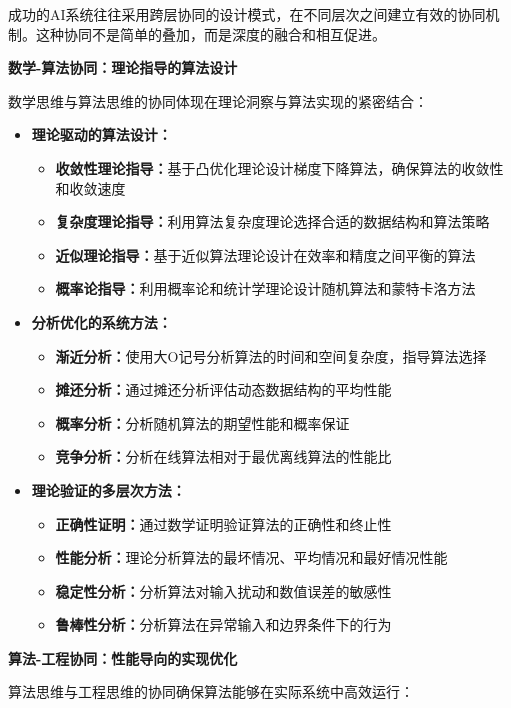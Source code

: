 成功的AI系统往往采用跨层协同的设计模式，在不同层次之间建立有效的协同机制。这种协同不是简单的叠加，而是深度的融合和相互促进。

\textbf{数学-算法协同：理论指导的算法设计}

数学思维与算法思维的协同体现在理论洞察与算法实现的紧密结合：

\begin{itemize}
\item \textbf{理论驱动的算法设计：}
\begin{itemize}
\item \textbf{收敛性理论指导：}基于凸优化理论设计梯度下降算法，确保算法的收敛性和收敛速度
\item \textbf{复杂度理论指导：}利用算法复杂度理论选择合适的数据结构和算法策略
\item \textbf{近似理论指导：}基于近似算法理论设计在效率和精度之间平衡的算法
\item \textbf{概率论指导：}利用概率论和统计学理论设计随机算法和蒙特卡洛方法
\end{itemize}

\item \textbf{分析优化的系统方法：}
\begin{itemize}
\item \textbf{渐近分析：}使用大O记号分析算法的时间和空间复杂度，指导算法选择
\item \textbf{摊还分析：}通过摊还分析评估动态数据结构的平均性能
\item \textbf{概率分析：}分析随机算法的期望性能和概率保证
\item \textbf{竞争分析：}分析在线算法相对于最优离线算法的性能比
\end{itemize}

\item \textbf{理论验证的多层次方法：}
\begin{itemize}
\item \textbf{正确性证明：}通过数学证明验证算法的正确性和终止性
\item \textbf{性能分析：}理论分析算法的最坏情况、平均情况和最好情况性能
\item \textbf{稳定性分析：}分析算法对输入扰动和数值误差的敏感性
\item \textbf{鲁棒性分析：}分析算法在异常输入和边界条件下的行为
\end{itemize}
\end{itemize}

\textbf{算法-工程协同：性能导向的实现优化}

算法思维与工程思维的协同确保算法能够在实际系统中高效运行：

